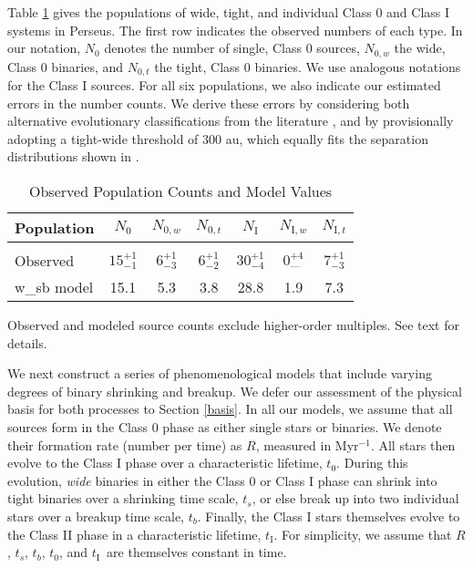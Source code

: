 \documentclass[usenatbib,a4paper]{mnras}
\newcommand{\tOI}{\mbox{$t_{0}$}} %
\newcommand{\NIw}{\mbox{$N_{\textrm{I},w}$}} %
\newcommand{\NIt}{\mbox{$N_{\textrm{I},t}$}}%
\newcommand{\NI}{\mbox{$N_\textrm{I}$}}%
\newcommand{\tI}{\mbox{$t_\textrm{I}$}}%
\begin{document}
Table \ref{resultsTable} gives the populations of wide, tight, and individual Class 0 and Class I systems in Perseus.  The first row indicates the observed numbers of each type.  In our notation, $N_0$ denotes the number of single, Class 0 sources, $N_{0,w}$ the wide, Class 0 binaries, and $N_{0,t}$ the tight, Class 0 binaries.  We use analogous notations for the Class I sources.  For all six populations, we also indicate our estimated errors in the number counts.  We derive these errors by considering both alternative evolutionary classifications from the literature \citep[e.g.,][]{SadavoyPhD, Sadavoy14, Murillo16}, and by provisionally adopting a tight-wide threshold of 300 au, which equally fits the separation distributions shown in \citet{Tobin16}. 

\begin{table}
\begin{threeparttable}
\caption{Observed Population Counts and Model Values}\label{resultsTable}
\begin{tabular}{lcccccc}
\hline\hline
Population			& $N_0$		&$N_{0,w}$	& $N_{0,t}$	& \NI		& \NIw		& \NIt \\
\hline\\[-3mm]
Observed				& $15^{+1}_{-1}$	& $6^{+1}_{-3}$& $6^{+1}_{-2}$&  $30^{+1}_{-4}$ & $0^{+4}_{\mbox{---}}$	& $7^{+1}_{-3}$  \\[1mm]
w\_sb model			& 15.1		& 5.3			& 3.8			& 28.8	& 1.9			& 7.3 \\
\hline
\end{tabular}
\begin{tablenotes}
\item Observed and modeled source counts exclude higher-order multiples.  See text for details.
\end{tablenotes}
\end{threeparttable}
\end{table}

We next construct a series of phenomenological models that include varying degrees of binary shrinking and breakup.  We defer our assessment of the physical basis for both processes to Section \ref{basis}.  In all our models, we assume that all sources form in the Class 0 phase as either single stars or binaries.  We denote their formation rate (number per time) as $R$, measured in Myr$^{-1}$.  All stars then evolve to the Class I phase over a characteristic lifetime, \tOI.  During this evolution,  \emph{wide} binaries in either the Class 0 or Class I phase can shrink into tight binaries over a shrinking time scale, $t_s$, or else break up into two individual stars over a breakup time scale, $t_b$. Finally, the Class I stars themselves evolve to the Class II phase in a characteristic lifetime, \tI.  For simplicity, we assume that $R$, $t_s$, $t_b$, \tOI, and \tI\ are themselves constant in time.
\end{document}
